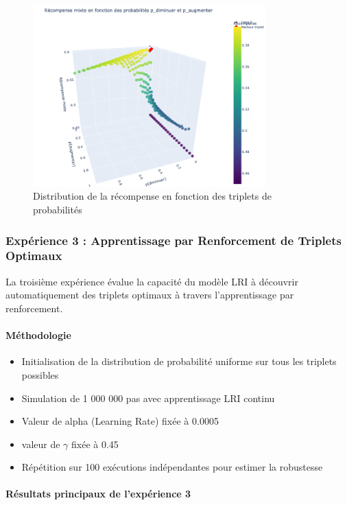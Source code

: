 \documentclass[a4paper,11pt]{article}
\begin{document}
\begin{figure}[h]
    \centering
    \includegraphics[width=0.8\textwidth]{figures/exp2.png}
    \caption{Distribution de la récompense en fonction des triplets de probabilités}
    \label{fig:recompense_3d}
\end{figure}

\subsubsection{Expérience 3 : Apprentissage par Renforcement de Triplets Optimaux}

La troisième expérience évalue la capacité du modèle LRI à découvrir automatiquement des triplets optimaux à travers l'apprentissage par renforcement.

\paragraph{Méthodologie}
\begin{itemize}
    \item Initialisation de la distribution de probabilité uniforme sur tous les triplets possibles
    \item Simulation de 1 000 000 pas avec apprentissage LRI continu
    \item Valeur de alpha (Learning Rate) fixée à 0.0005
    \item valeur de $\gamma$ fixée à 0.45 
    \item Répétition sur 100 exécutions indépendantes pour estimer la robustesse

\end{itemize}


\paragraph{Résultats principaux de l'expérience 3}\
\end{document}
